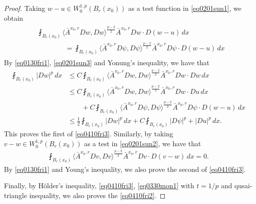 \documentclass[reqno]{amsart}
\numberwithin{equation}{section}
\theoremstyle{plain}
\theoremstyle{definition}
\theoremstyle{remark}
\providecommand{\abs}[1]{\lvert#1\rvert}
\providecommand{\ip}[1]{\langle#1\rangle}
\begin{document}
\begin{proof}
Taking $w-u\in W^{1,p}_0(B_r(x_0))$ as a test function in \eqref{eq0201sun1}, we obtain
\begin{align} \label{eq0201sun3}
\begin{split}
&\fint_{B_r(x_0)} \ip{ \bar{A}^{x_0,r}  Dw,Dw}^{\frac{p-2}{2}} \bar{A}^{x_0,r} Dw\cdot D(w-u) \,dx \\
&\qquad\qquad = \fint_{B_r(x_0)}  \ip{ \bar{A}^{x_0,r} D\psi,D\psi}^{\frac{p-2}{2}} \bar{A}^{x_0,r} D\psi\cdot D(w-u)  \,dx
\end{split}
\end{align}
By \eqref{eq0130fri1}, \eqref{eq0201sun3} and Yonung's inequality, we have that
\begin{align*}
\fint_{B_r(x_0)} \abs{Dw}^p \, dx &\leq C\fint_{B_r(x_0)} \ip{\bar{A}^{x_0,r} Dw,Dw}^{\frac{p-2}{2}} \bar{A}^{x_0,r}Dw\cdot Dw \,dx\\
&\leq C\fint_{B_r(x_0)} \ip{\bar{A}^{x_0,r} Dw,Dw}^{\frac{p-2}{2}}\bar{A}^{x_0,r}Dw\cdot Du\, dx \\
&\qquad +C\fint_{B_r(x_0)}  \ip{\bar{A}^{x_0,r}  D\psi,D\psi}^{\frac{p-2}{2}} \bar{A}^{x_0,r}D\psi\cdot D(w-u) \,dx \\
&\leq \frac{1}{2}  \fint_{B_r(x_0)}  \abs{Dw}^p\, dx+C  \fint_{B_r(x_0)}  \abs{D\psi}^p+ \abs{Du}^p \,dx.
\end{align*}
This proves the first of \eqref{eq0410fri3}. Similarly, by taking $v-w\in W^{1,p}_0(B_r(x_0))$ as a test in \eqref{eq0201sun2},
we have that
\begin{align*}
\fint_{B_r(x_0)} \ip{ \bar{A}^{x_0,r}  Dv,Dv}^{\frac{p-2}{2}} \bar{A}^{x_0,r} Dv\cdot D(v-w) \,dx=0.
\end{align*}
By \eqref{eq0130fri1} and Young's inequality, we also prove the second of \eqref{eq0410fri3}.

Finally, by H\"{o}lder's inequality, \eqref{eq0410fri3}, \eqref{eq0330mon1} with $t=1/p$ and qusai-triangle inequality, we also proves the \eqref{eq0410fri2}.
\end{proof}
\end{document}
